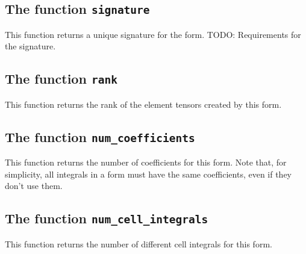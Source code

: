 




\subsection{The function \texttt{signature}}
This function returns a unique signature for the form.
TODO: Requirements for the signature.



\subsection{The function \texttt{rank}}
This function returns the rank of the element tensors created by this form.



\subsection{The function \texttt{num\_coefficients}}
This function returns the number of coefficients for this form.
Note that, for simplicity, all integrals in a form must have
the same coefficients, even if they don't use them.



\subsection{The function \texttt{num\_cell\_integrals}}
This function returns the number of different cell integrals for this form.


